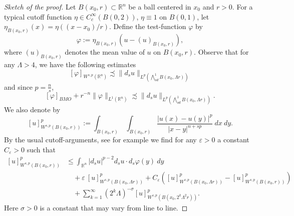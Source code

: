 \documentclass[12pt]{amsart}
\def\eps{\varepsilon}
\def\vp{\varphi}
\theoremstyle{definition}
\newcommand{\R}{\mathbb{R}}
\newcommand{\brac}[1]{\left (#1 \right )}
\newcommand{\Ep}{\bigwedge\nolimits}
\numberwithin{theorem}{section} \numberwithin{equation}{section}
\newcommand{\aleq}{\precsim}
\begin{document}
\begin{proof}[Sketch of the proof]
Let $B(x_0,r) \subset \R^n$ be a ball centered in $x_0$ and $r > 0$.  For a typical cutoff function $\eta \in C_c^\infty(B(0,2))$, $\eta \equiv 1$ on $B(0,1)$, let $\eta_{B(x_0,r)}(x) = \eta((x-x_0)/r)$. Define the test-function $\varphi$ by
\[
 \varphi := \eta_{B(x_0,r)} (u-(u)_{B(x_0,r)}),
\]
where $(u)_{B(x_0,r)}$ denotes the mean value of $u$ on $B(x_0,r)$.
Observe that for any $\Lambda > 4$, we have the following estimates
\[[\vp]_{W^{s,p}(\R^n)}\aleq \|d_s u\|_{L^{p}(\Ep^1_{od}B(x_0, \Lambda r))}\] 
and since $p=\frac{n}{s}$, 
\[
[\varphi]_{BMO} + r^{-n} \|\varphi\|_{L^1(\R^n)} \aleq \|d_s u\|_{L^{p}(\Ep^1_{od}B(x_0, \Lambda r))}.
\]
% 
% 
We also denote by
\[
 [u]^{p}_{W^{s,p}(B(x_0,r))} := \int_{B(x_0,r)}\ \int_{B(x_0,r)} \frac{|u(x)-u(y)|^{p}}{|x-y|^{n+sp}}\ dx\ dy.
\]
By the usual cutoff-arguments, see for example \cite[Lemma 4.1]{Schikorra-CPDE} we find for any $\eps > 0$ a constant $C_\eps > 0$ such that
\[
 \begin{split}
 [u]^{p}_{W^{s,p}(B(x_0,r))} &\leq  \int_{\R^n} |d_s u|^{p-2} d_s u \cdot d_s \varphi(y)\ dy\\
&\quad +\eps\ [u]^{p}_{W^{s,p}(B(x_0,\Lambda r))} + C_\eps \brac{[u]^{p}_{W^{s,p}(B(x_0,\Lambda r))} - [u]^{p}_{W^{s,p}(B(x_0,r))}}\\
  &\quad +\sum_{k=1}^\infty (2^{k} \Lambda)^{-\sigma} [u]_{W^{s,p}(B(x_0,2^k \Lambda^2 r))}^p.
\end{split}
 \]
Here $\sigma > 0$ is a constant that may vary from line to line.


\end{proof}
\end{document}
